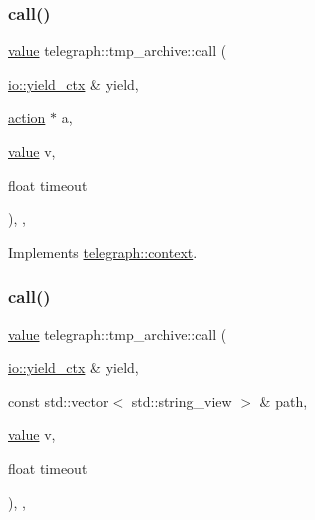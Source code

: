 \subsubsection{\texorpdfstring{call()}{call()}\hspace{0.1cm}{\footnotesize\ttfamily [1/2]}}
{\footnotesize\ttfamily \hyperlink{classtelegraph_1_1value}{value} telegraph\+::tmp\+\_\+archive\+::call (\begin{DoxyParamCaption}\item[{\hyperlink{structboost_1_1asio_1_1yield__ctx}{io\+::yield\+\_\+ctx} \&}]{yield,  }\item[{\hyperlink{classtelegraph_1_1action}{action} $\ast$}]{a,  }\item[{\hyperlink{classtelegraph_1_1value}{value}}]{v,  }\item[{float}]{timeout }\end{DoxyParamCaption})\hspace{0.3cm}{\ttfamily [inline]}, {\ttfamily [override]}, {\ttfamily [virtual]}}



Implements \hyperlink{classtelegraph_1_1context_a72da471eb635e5505b10d2f1103359ac}{telegraph\+::context}.

\mbox{\label{classtelegraph_1_1tmp__archive_a1ccf8c90f14b36f3a09a501e0931e42e}} 
\subsubsection{\texorpdfstring{call()}{call()}\hspace{0.1cm}{\footnotesize\ttfamily [2/2]}}
{\footnotesize\ttfamily \hyperlink{classtelegraph_1_1value}{value} telegraph\+::tmp\+\_\+archive\+::call (\begin{DoxyParamCaption}\item[{\hyperlink{structboost_1_1asio_1_1yield__ctx}{io\+::yield\+\_\+ctx} \&}]{yield,  }\item[{const std\+::vector$<$ std\+::string\+\_\+view $>$ \&}]{path,  }\item[{\hyperlink{classtelegraph_1_1value}{value}}]{v,  }\item[{float}]{timeout }\end{DoxyParamCaption})\hspace{0.3cm}{\ttfamily [inline]}, {\ttfamily [override]}, {\ttfamily [virtual]}}



